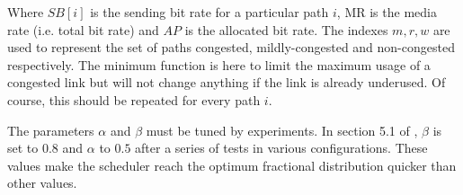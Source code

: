 Where $SB[i]$ is the sending bit rate for a particular path $i$, MR is the media rate (i.e. total bit rate) and $AP$ is the allocated bit rate. The indexes $m,r,w$ are used to represent the set of paths congested, mildly-congested and non-congested respectively. The minimum function is here to limit the maximum usage of a congested link but will not change anything if the link is already underused. Of course, this should be repeated for every path $i$.

The parameters $\alpha$ and $\beta$ must be tuned by experiments. In section 5.1 of \cite{singh2013mprtp}, $\beta$ is set to $0.8$ and $\alpha$ to $0.5$ after a series of tests in various configurations. These values make the scheduler reach the optimum fractional distribution quicker than other values.